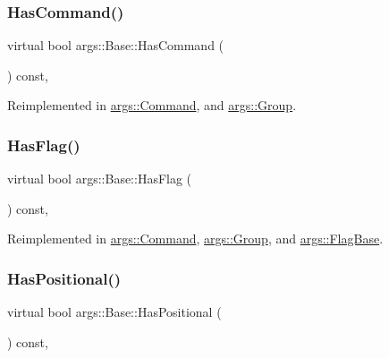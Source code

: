 \subsubsection{\texorpdfstring{Has\+Command()}{HasCommand()}}
{\footnotesize\ttfamily virtual bool args\+::\+Base\+::\+Has\+Command (\begin{DoxyParamCaption}{ }\end{DoxyParamCaption}) const\hspace{0.3cm}{\ttfamily [inline]}, {\ttfamily [virtual]}}



Reimplemented in \hyperlink{classargs_1_1_command_aa7117d38f553f127542434f6cafc2697}{args\+::\+Command}, and \hyperlink{classargs_1_1_group_a022cbdf1f4bfe4210a56fa8ca9045bf8}{args\+::\+Group}.

\mbox{\label{classargs_1_1_base_a81684f399665c0372439c070af5de4a7}} 
\subsubsection{\texorpdfstring{Has\+Flag()}{HasFlag()}}
{\footnotesize\ttfamily virtual bool args\+::\+Base\+::\+Has\+Flag (\begin{DoxyParamCaption}{ }\end{DoxyParamCaption}) const\hspace{0.3cm}{\ttfamily [inline]}, {\ttfamily [virtual]}}



Reimplemented in \hyperlink{classargs_1_1_command_abcf9fafcb1531d3c0ea8a1b3a31c6ba4}{args\+::\+Command}, \hyperlink{classargs_1_1_group_a67e35305748038c175dee92ad1f5290f}{args\+::\+Group}, and \hyperlink{classargs_1_1_flag_base_a67b6fa7bfd7b3ed18caeb2a6381ed1a2}{args\+::\+Flag\+Base}.

\mbox{\label{classargs_1_1_base_a3825f4afe867335438103a0d45ced9f7}} 
\subsubsection{\texorpdfstring{Has\+Positional()}{HasPositional()}}
{\footnotesize\ttfamily virtual bool args\+::\+Base\+::\+Has\+Positional (\begin{DoxyParamCaption}{ }\end{DoxyParamCaption}) const\hspace{0.3cm}{\ttfamily [inline]}, {\ttfamily [virtual]}}



